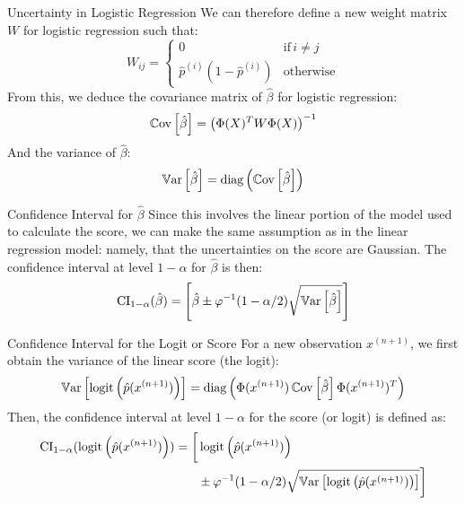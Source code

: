 \begin{frame}{Uncertainty in Logistic Regression}
	We can therefore define a new weight matrix $W$ for logistic regression such that:
	\begin{equation}
		W_{ij} = \begin{cases}
			0 & \text{if} \, i \ne j \\
			\hat{p}^{(i)}(1 - \hat{p}^{(i)}) & \text{otherwise}
		\end{cases}
		\nonumber
	\end{equation}
	\pause
	From this, we deduce the covariance matrix of $\hat{\beta}$ for logistic regression:
	\begin{equation}
		\operatorname{\mathbb{C}ov}\left[\hat{\beta}\right] = \left(\Phi(X)^T W \Phi(X)\right)^{-1}
		\nonumber
	\end{equation}
	\pause
	And the variance of $\hat{\beta}$:
	\begin{equation}
		\operatorname{\mathbb{V}ar}\left[\hat{\beta}\right] = \text{diag}\left(\operatorname{\mathbb{C}ov}\left[\hat{\beta}\right]\right)
		\nonumber
	\end{equation}	
\end{frame}

\begin{frame}{Confidence Interval for $\hat{\beta}$}
	Since this involves the linear portion of the model used to calculate the score, we can make the same assumption as in the linear regression model: namely, that the uncertainties on the score are Gaussian. The confidence interval at level $1 - \alpha$ for $\hat{\beta}$ is then:
	\begin{equation}
		\text{CI}_{1-\alpha}(\hat{\beta}) = \left[\hat{\beta} \pm \varphi^{-1}(1 - \alpha/2) \sqrt{\operatorname{\mathbb{V}ar}\left[\hat{\beta}\right]}\right]
		\nonumber
	\end{equation}	
\end{frame}

\begin{frame}{Confidence Interval for the Logit or Score}
	For a new observation $x^{(n+1)}$, we first obtain the variance of the linear score (the logit):
	\begin{equation}
		\operatorname{\mathbb{V}ar}\left[\operatorname{logit}\left(\hat{p}(x^{(n+1)})\right)\right] = \operatorname{diag}\left(\Phi(x^{(n+1)}) \operatorname{\mathbb{C}ov}\left[\hat{\beta}\right] \Phi(x^{(n+1)})^T\right)
		\nonumber
	\end{equation}
	\pause
	Then, the confidence interval at level $1-\alpha$ for the score (or logit) is defined as:
	\begin{equation}
		\begin{split}
			\text{CI}_{1-\alpha}(\operatorname{logit}\left(\hat{p}(x^{(n+1)})\right)) = \bigg[
			&\operatorname{logit}\left(\hat{p}(x^{(n+1)})\right) \\
			&\pm \varphi^{-1}(1 - \alpha/2) \sqrt{\operatorname{\mathbb{V}ar}\left[\operatorname{logit}\left(\hat{p}(x^{(n+1)})\right)\right]}\bigg]			
		\end{split}
		\nonumber
	\end{equation}
\end{frame}

